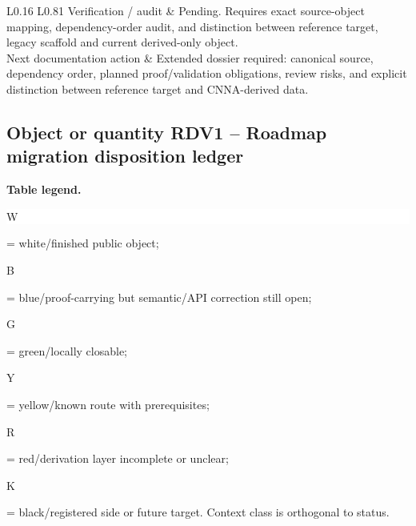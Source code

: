 \begin{longtable}{L{0.16\linewidth} L{0.81\linewidth}}
\hline\addlinespace[0.20em]
Verification /\allowbreak{} audit & Pending. Requires exact source-object mapping, dependency-order audit, and distinction between reference target, legacy scaffold and current derived-only object.\\
\hline\addlinespace[0.20em]
Next documentation action & Extended dossier required: canonical source, dependency order, planned proof/\allowbreak{}validation obligations, review risks, and explicit distinction between reference target and CNNA-derived data.\\
\hline\addlinespace[0.20em]
\end{longtable}
\subsection*{Object or quantity RDV1 -- Roadmap migration disposition ledger}
\hypertarget{objproof:RDV1}{}
\par\smallskip\noindent\begin{minipage}{0.99\linewidth}\footnotesize\raggedright\textbf{Table legend.} \colorbox{white}{\strut W} = white/finished public object; \colorbox{cyan!20}{\strut B} = blue/proof-carrying but semantic/API correction still open; \colorbox{green!18}{\strut G} = green/locally closable; \colorbox{yellow!25}{\strut Y} = yellow/known route with prerequisites; \colorbox{red!20}{\strut R} = red/derivation layer incomplete or unclear; \colorbox{black!18}{\strut K} = black/registered side or future target. Context class is orthogonal to status.\end{minipage}\par\vspace{0.25em}
